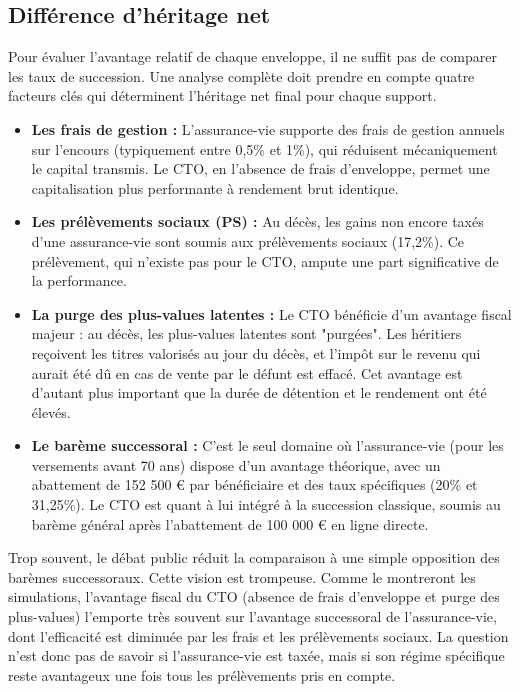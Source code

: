 \subsection{Différence d'héritage net}
\label{sec:diff_heritage}

Pour évaluer l'avantage relatif de chaque enveloppe, il ne suffit pas de comparer les taux de succession. Une analyse complète doit prendre en compte quatre facteurs clés qui déterminent l'héritage net final pour chaque support.
\begin{itemize}
    \item \textbf{Les frais de gestion :} L'assurance-vie supporte des frais de gestion annuels sur l'encours (typiquement entre 0,5\% et 1\%), qui réduisent mécaniquement le capital transmis. Le CTO, en l'absence de frais d'enveloppe, permet une capitalisation plus performante à rendement brut identique.
    
    \item \textbf{Les prélèvements sociaux (PS) :} Au décès, les gains non encore taxés d'une assurance-vie sont soumis aux prélèvements sociaux (17,2\%). Ce prélèvement, qui n'existe pas pour le CTO, ampute une part significative de la performance.
    
    \item \textbf{La purge des plus-values latentes :} Le CTO bénéficie d'un avantage fiscal majeur : au décès, les plus-values latentes sont "purgées". Les héritiers reçoivent les titres valorisés au jour du décès, et l'impôt sur le revenu qui aurait été dû en cas de vente par le défunt est effacé. Cet avantage est d'autant plus important que la durée de détention et le rendement ont été élevés.
    
    \item \textbf{Le barème successoral :} C'est le seul domaine où l'assurance-vie (pour les versements avant 70 ans) dispose d'un avantage théorique, avec un abattement de 152 500 € par bénéficiaire et des taux spécifiques (20\% et 31,25\%). Le CTO est quant à lui intégré à la succession classique, soumis au barème général après l'abattement de 100 000 € en ligne directe.
\end{itemize}

Trop souvent, le débat public réduit la comparaison à une simple opposition des barèmes successoraux. Cette vision est trompeuse. Comme le montreront les simulations, l'avantage fiscal du CTO (absence de frais d'enveloppe et purge des plus-values) l'emporte très souvent sur l'avantage successoral de l'assurance-vie, dont l'efficacité est diminuée par les frais et les prélèvements sociaux. La question n'est donc pas de savoir si l'assurance-vie est taxée, mais si son régime spécifique reste avantageux une fois tous les prélèvements pris en compte.
